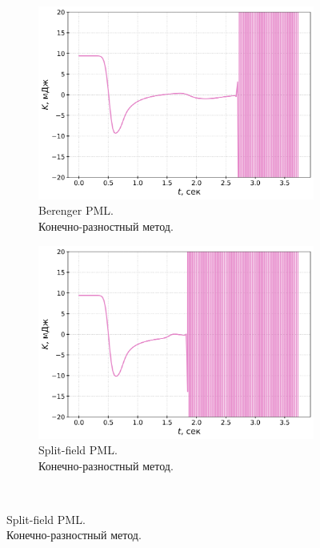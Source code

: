 \begin{figure}[htb]
\centering
    \begin{subfigure}{0.475\textwidth}
        \centering
        \includegraphics[width=1.0\textwidth]{images/pml/osc_fd_Berenger.png}
        \caption{Berenger PML.\\Конечно-разностный метод.}
        \label{fig:osc_fd_berenger}
    \end{subfigure}
\hfill
    \begin{subfigure}{0.475\textwidth}
        \centering
        \includegraphics[width=1.0\textwidth]{images/pml/osc_fd_split-field.png}
        \caption{Split-field PML.\\Конечно-разностный метод.}
        \label{fig:osc_fd_split}
    \end{subfigure}
\vspace{0.5cm}\\

\end{figure}
